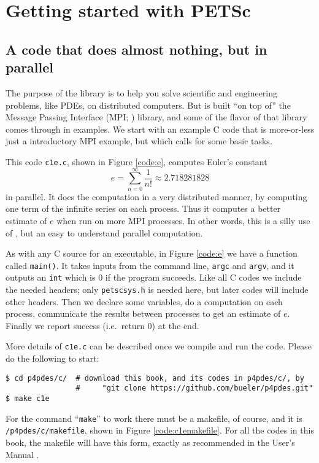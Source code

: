 
\chapter{Getting started with PETSc}
\label{chap:getstarted}

\section{A code that does almost nothing, but in parallel}

The purpose of the \PETSc library is to help you solve scientific and engineering problems, like PDEs, on distributed computers.  But \PETSc is built ``on top of'' the Message Passing Interface (MPI; \citep{Groppetal1999}) library, and some of the flavor of that library comes through in examples.  We start with an example C code that is more-or-less just a introductory MPI example, but which calls \PETSc for some basic tasks.

This code \texttt{c1e.c}, shown in Figure \ref{code:e}, computes Euler's constant
\begin{equation}
e = \sum_{n = 0}^\infty \frac{1}{n!} \approx 2.718281828 \label{introeseries}
\end{equation}
in parallel.  It does the computation in a very distributed manner, by computing one term of the infinite series on each process.  Thus it computes a better estimate of $e$ when run on more MPI processes.  In other words, this is a silly use of \PETSc, but an easy to understand parallel computation.

As with any C source for an executable, in Figure \ref{code:e} we have a function called \texttt{main()}.  It takes inputs from the command line, \texttt{argc} and \texttt{argv},  and it outputs an \texttt{int} which is $0$ if the program succeeds.  Like all C codes we include the needed headers; only \texttt{petscsys.h} is needed here, but later codes will include other \PETSc headers.  Then we declare some variables, do a computation on each process, communicate the results between processes to get an estimate of $e$.  Finally we report success (i.e.~return $0$) at the end.

More details of \texttt{c1e.c} can be described once we compile and run the code.  Please do the following to start:
\begin{Verbatim}[fontsize=\small]
$ cd p4pdes/c/  # download this book, and its codes in p4pdes/c/, by
                #     "git clone https://github.com/bueler/p4pdes.git"
$ make c1e
\end{Verbatim}
For the command ``\texttt{make}'' to work there must be a makefile, of course, and it is \texttt{/p4pdes/c/makefile}, shown in Figure \ref{code:c1emakefile}.  For all the codes in this book, the makefile will have this form, exactly as recommended in the \PETSc User's Manual \citep{petsc-user-ref}.

